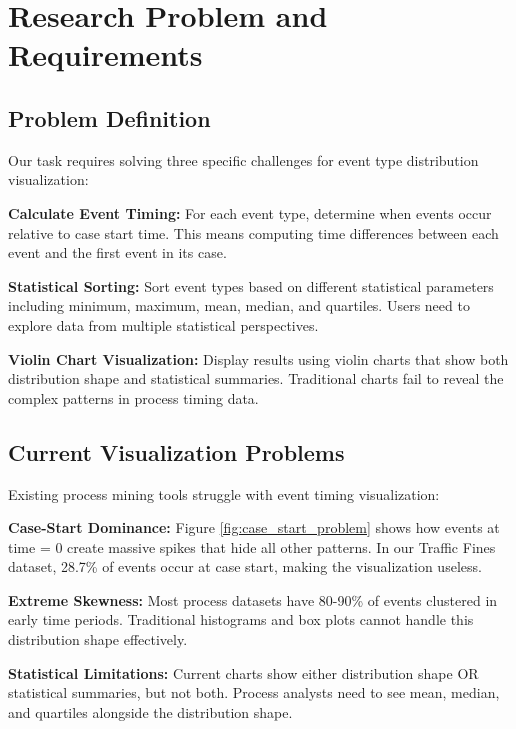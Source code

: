 
\section{Research Problem and Requirements}
\label{sec:problem}

\subsection{Problem Definition}
\label{subsec:problem_definition}

Our task requires solving three specific challenges for event type distribution visualization:

\textbf{Calculate Event Timing:} For each event type, determine when events occur relative to case start time. This means computing time differences between each event and the first event in its case.

\textbf{Statistical Sorting:} Sort event types based on different statistical parameters including minimum, maximum, mean, median, and quartiles. Users need to explore data from multiple statistical perspectives.

\textbf{Violin Chart Visualization:} Display results using violin charts that show both distribution shape and statistical summaries. Traditional charts fail to reveal the complex patterns in process timing data.

\subsection{Current Visualization Problems}
\label{subsec:current_problems}

Existing process mining tools struggle with event timing visualization:

\textbf{Case-Start Dominance:} Figure \ref{fig:case_start_problem} shows how events at time = 0 create massive spikes that hide all other patterns. In our Traffic Fines dataset, 28.7\% of events occur at case start, making the visualization useless.

\textbf{Extreme Skewness:} Most process datasets have 80-90\% of events clustered in early time periods. Traditional histograms and box plots cannot handle this distribution shape effectively.

\textbf{Statistical Limitations:} Current charts show either distribution shape OR statistical summaries, but not both. Process analysts need to see mean, median, and quartiles alongside the distribution shape.

